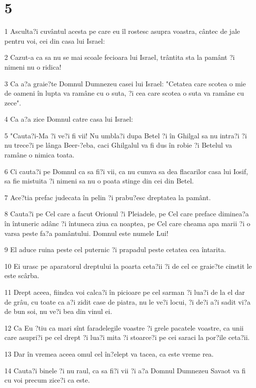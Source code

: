 \chapter{5}

\par 1 Asculta?i cuvântul acesta pe care eu îl rostesc asupra voastra, cântec de jale pentru voi, cei din casa lui Israel:
\par 2 Cazut-a ca sa nu se mai scoale fecioara lui Israel, trântita sta la pamânt ?i nimeni nu o ridica!
\par 3 Ca a?a graie?te Domnul Dumnezeu casei lui Israel: "Cetatea care scotea o mie de oameni în lupta va ramâne cu o suta, ?i cea care scotea o suta va ramâne cu zece".
\par 4 Ca a?a zice Domnul catre casa lui Israel:
\par 5 "Cauta?i-Ma ?i ve?i fi vii! Nu umbla?i dupa Betel ?i în Ghilgal sa nu intra?i ?i nu trece?i pe lânga Beer-?eba, caci Ghilgalul va fi dus în robie ?i Betelul va ramâne o nimica toata.
\par 6 Ci cauta?i pe Domnul ca sa fi?i vii, ca nu cumva sa dea flacarilor casa lui Iosif, sa fie mistuita ?i nimeni sa nu o poata stinge din cei din Betel.
\par 7 Ace?tia prefac judecata în pelin ?i prabu?esc dreptatea la pamânt.
\par 8 Cauta?i pe Cel care a facut Orionul ?i Pleiadele, pe Cel care preface diminea?a în întuneric adânc ?i întuneca ziua ca noaptea, pe Cel care cheama apa marii ?i o varsa peste fa?a pamântului. Domnul este numele Lui!
\par 9 El aduce ruina peste cel puternic ?i prapadul peste cetatea cea întarita.
\par 10 Ei urasc pe aparatorul dreptului la poarta ceta?ii ?i de cel ce graie?te cinstit le este scârba.
\par 11 Drept aceea, fiindca voi calca?i în picioare pe cel sarman ?i lua?i de la el dar de grâu, cu toate ca a?i zidit case de piatra, nu le ve?i locui, ?i de?i a?i sadit vi?a de bun soi, nu ve?i bea din vinul ei.
\par 12 Ca Eu ?tiu ca mari sînt faradelegile voastre ?i grele pacatele voastre, ca unii care asupri?i pe cel drept ?i lua?i mita ?i stoarce?i pe cei saraci la por?ile ceta?ii.
\par 13 Dar în vremea aceea omul cel în?elept va tacea, ca este vreme rea.
\par 14 Cauta?i binele ?i nu raul, ca sa fi?i vii ?i a?a Domnul Dumnezeu Savaot va fi cu voi precum zice?i ca este.
